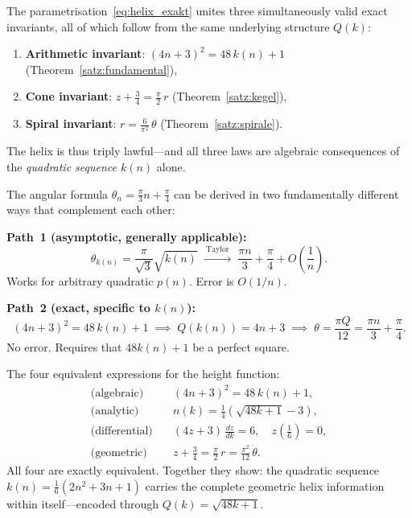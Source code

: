 \begin{bemerkung}
The parametrisation~\eqref{eq:helix_exakt} unites three simultaneously
valid exact invariants, all of which follow from the same underlying
structure $Q(k)$:
\begin{enumerate}
  \item \textbf{Arithmetic invariant}:
        $(4n+3)^2 = 48\,k(n)+1$ \quad (Theorem~\ref{satz:fundamental}),
  \item \textbf{Cone invariant}:
        $z + \tfrac{3}{4} = \tfrac{\pi}{2}\,r$ \quad (Theorem~\ref{satz:kegel}),
  \item \textbf{Spiral invariant}:
        $r = \tfrac{6}{\pi^2}\,\theta$ \quad (Theorem~\ref{satz:spirale}).
\end{enumerate}
The helix is thus triply lawful---and all three laws are algebraic
consequences of the \emph{quadratic sequence $k(n)$} alone.
\end{bemerkung}

\begin{tcolorbox}[
  title={Summary: Both Derivation Paths at a Glance},
  colback=blue!3,
  colframe=blue!40!black,
  enhanced,
  breakable
]
The angular formula $\theta_n = \tfrac{\pi}{3}n + \tfrac{\pi}{4}$
can be derived in two fundamentally different ways
that complement each other:

\medskip
\textbf{Path~1 (asymptotic, generally applicable):}
\[
  \theta_{k(n)} = \frac{\pi}{\sqrt{3}}\sqrt{k(n)}
  \;\xrightarrow{\;\text{Taylor}\;}\;
  \frac{\pi n}{3} + \frac{\pi}{4} + O\!\left(\frac{1}{n}\right).
\]
Works for arbitrary quadratic $p(n)$. Error is $O(1/n)$.

\medskip
\textbf{Path~2 (exact, specific to $k(n)$):}
\[
  (4n+3)^2 = 48\,k(n)+1
  \;\implies\;
  Q(k(n)) = 4n+3
  \;\implies\;
  \theta = \frac{\pi Q}{12} = \frac{\pi n}{3} + \frac{\pi}{4}.
\]
No error. Requires that $48k(n)+1$ be a perfect square.

\medskip
The four equivalent expressions for the height function:
\begin{align*}
  \text{(algebraic)} &\quad (4n+3)^2 = 48\,k(n)+1, \\[3pt]
  \text{(analytic)}  &\quad n(k) = \tfrac{1}{4}\!\left(\sqrt{48k+1}-3\right), \\[3pt]
  \text{(differential)} &\quad (4z+3)\,\tfrac{dz}{dk} = 6, \quad
                              z\!\left(\tfrac{1}{6}\right)=0, \\[3pt]
  \text{(geometric)} &\quad z + \tfrac{3}{4} = \tfrac{\pi}{2}\,r
                              = \tfrac{\pi^2}{12}\,\theta.
\end{align*}
All four are exactly equivalent. Together they show: the
quadratic sequence $k(n) = \tfrac{1}{6}(2n^2+3n+1)$ carries the
complete geometric helix information within itself---encoded
through $Q(k) = \sqrt{48k+1}$.
\end{tcolorbox}
